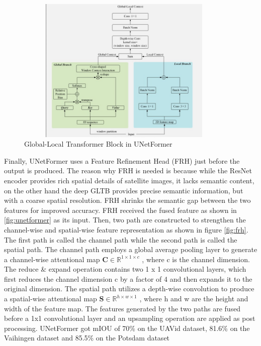 \begin{figure}[ht]
\includegraphics[width=10.5cm, height=7cm]{images/gltb.png}
\centering
\caption{Global-Local Transformer Block in UNetFormer}
\label{fig:gltb}
\end{figure}
\FloatBarrier

Finally, UNetFormer uses a Feature Refinement Head (FRH) just before the output is produced. The reason why FRH is needed is because while the ResNet encoder provides rich spatial details of satellite images, it lacks semantic content, on the other hand the deep GLTB provides precise semantic information, but with a coarse spatial resolution. FRH shrinks the semantic gap between the two features for improved accuracy. FRH received the fused feature as shown in \ref{fig:unetformer} as its input. Then, two path are constructed to strengthen the channel-wise and spatial-wise feature representation as shown in figure \ref{fig:frh}. The first path is called the channel path while the second path is called the spatial path. The channel path employs a global average pooling layer to generate a channel-wise attentional map $\textbf{C} \in \mathbb{R}^{1\times 1 \times c}$ , where c is the channel dimension. The reduce \& expand operation contains two 1 x 1 convolutional layers, which first reduces the channel dimension c by a factor of 4 and then expands it to the original dimension. The spatial path utilizes a depth-wise convolution to produce a spatial-wise attentional map $\textbf{S} \in \mathbb{R}^{h\times w \times 1}$  , where h and w are the height and width of the feature map. The features generated by the two paths are fused before a 1x1 convolutional layer and an upsampling operation are applied as post processing. UNetFormer got mIOU of 70\% on the UAVid dataset, 81.6\% on the Vaihingen dataset and 85.5\% on the Potsdam dataset



